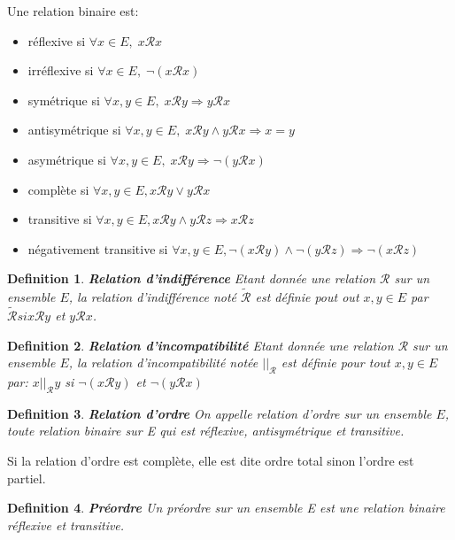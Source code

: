 \documentclass[a4paper,12pt,openany,oneside]{article}
\newtheorem{defn}{Definition} %
\begin{document}
Une relation binaire est:

\begin{itemize}
        \item réflexive si $\forall x\in E,\; x\mathcal{R}x$
        \item irréflexive si $\forall x\in E,\; \neg(x\mathcal{R}x)$
        \item symétrique si $\forall x,y\in E,\; x\mathcal{R}y\Rightarrow y\mathcal{R}x$
        \item antisymétrique si $\forall x,y\in E,\; x\mathcal{R}y\wedge y\mathcal{R}x\Rightarrow x=y$
        \item asymétrique si $\forall x,y\in E,\; x\mathcal{R}y\Rightarrow \neg(y\mathcal{R}x)$
        \item complète si $\forall x,y\in E, x\mathcal{R} y\vee y\mathcal{R}x$
        \item transitive si $\forall x,y\in E, x\mathcal{R} y\wedge y\mathcal{R}z\Rightarrow x\mathcal{R}z$
        \item négativement transitive si $\forall x,y\in E, \neg (x\mathcal{R} y)\wedge \neg (y\mathcal{R}z)\Rightarrow \neg(x\mathcal{R}z)$

\end{itemize}


\begin{defn}\textbf{Relation d'indifférence}
        Etant donnée une relation $\mathcal{R}$  sur un ensemble $E$, la relation d'indifférence noté $\tilde{\mathcal{R}}$ est définie pout out $x,y\in E$ par $\tilde{\mathcal{R}} si x\mathcal{R}y$ et $y\mathcal{R}x$.
\end{defn}

\begin{defn}\textbf{Relation d'incompatibilité}
        Etant donnée une relation $\mathcal{R}$ sur un ensemble $E$, la relation d'incompatibilité notée $||_{\mathcal{R}}$ est définie pour tout $x,y\in E$ par: $x||_{\mathcal{R}}y$ si $\neg(x\mathcal{R}y)$ et $\neg (y\mathcal{R}x)$
\end{defn}

\begin{defn}\textbf{Relation d'ordre}
        On appelle relation d'ordre sur un ensemble $E$, toute relation binaire sur E qui est réflexive, antisymétrique et transitive.
\end{defn}

Si la relation d’ordre est complète, elle est dite ordre total sinon l’ordre est partiel.
\begin{defn}\textbf{Préordre}
Un préordre sur un ensemble E est une relation binaire réflexive et transitive.
\end{defn}
\end{document}
